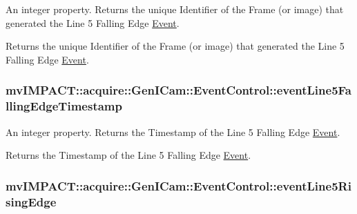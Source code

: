 An integer property. Returns the unique Identifier of the Frame (or image) that generated the Line 5 Falling Edge \hyperlink{classmv_i_m_p_a_c_t_1_1acquire_1_1_event}{Event}. 

Returns the unique Identifier of the Frame (or image) that generated the Line 5 Falling Edge \hyperlink{classmv_i_m_p_a_c_t_1_1acquire_1_1_event}{Event}. \hypertarget{classmv_i_m_p_a_c_t_1_1acquire_1_1_gen_i_cam_1_1_event_control_aea63a64784f99f09005896e54933dcf8}{
\subsubsection[{event\+Line5\+Falling\+Edge\+Timestamp}]{ mv\+I\+M\+P\+A\+C\+T\+::acquire\+::\+Gen\+I\+Cam\+::\+Event\+Control\+::event\+Line5\+Falling\+Edge\+Timestamp}}\label{classmv_i_m_p_a_c_t_1_1acquire_1_1_gen_i_cam_1_1_event_control_aea63a64784f99f09005896e54933dcf8}


An integer property. Returns the Timestamp of the Line 5 Falling Edge \hyperlink{classmv_i_m_p_a_c_t_1_1acquire_1_1_event}{Event}. 

Returns the Timestamp of the Line 5 Falling Edge \hyperlink{classmv_i_m_p_a_c_t_1_1acquire_1_1_event}{Event}. \hypertarget{classmv_i_m_p_a_c_t_1_1acquire_1_1_gen_i_cam_1_1_event_control_af9bf5122828e416f21495c61bf56e3a5}{
\subsubsection[{event\+Line5\+Rising\+Edge}]{ mv\+I\+M\+P\+A\+C\+T\+::acquire\+::\+Gen\+I\+Cam\+::\+Event\+Control\+::event\+Line5\+Rising\+Edge}}\label{classmv_i_m_p_a_c_t_1_1acquire_1_1_gen_i_cam_1_1_event_control_af9bf5122828e416f21495c61bf56e3a5}


